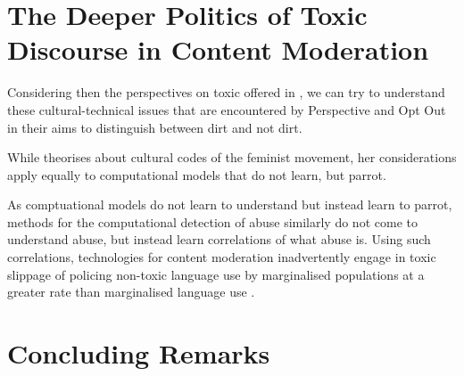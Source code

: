 
\section{The Deeper Politics of Toxic Discourse in Content Moderation}

Considering then the perspectives on toxic offered in \cite{Risam:2015}, we can try to understand these cultural-technical issues that are encountered by Perspective and Opt Out in their aims to distinguish between dirt and not dirt.

While \citet{Rissam:2015} theorises about cultural codes of the feminist movement, her considerations apply equally to computational models that do not learn, but parrot\citep{Bender:2020}.

As comptuational models do not learn to understand \citep{Bender:2020} but instead learn to parrot, methods for the computational detection of abuse similarly do not come to understand abuse, but instead learn correlations of what abuse is. Using such correlations, technologies for content moderation inadvertently engage in toxic slippage of policing non-toxic language use by marginalised populations at a greater rate than marginalised language use \cite{Oliva:2020}.

\section{Concluding Remarks}

